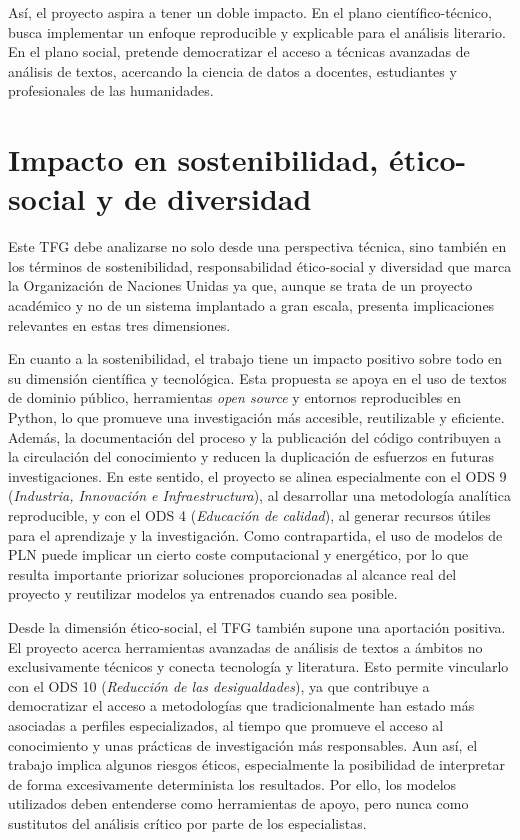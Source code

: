\documentclass[IB]{TFUOC}%
\begin{document}
Así, el proyecto aspira a tener un doble impacto. En el plano científico-técnico, busca implementar un enfoque reproducible y explicable para el análisis literario. En el plano social, pretende democratizar el acceso a técnicas avanzadas de análisis de textos, acercando la ciencia de datos a docentes, estudiantes y profesionales de las humanidades.

\section{Impacto en sostenibilidad, ético-social y de diversidad}

Este TFG debe analizarse no solo desde una perspectiva técnica, sino también en los términos de sostenibilidad, responsabilidad ético-social y diversidad que marca la Organización de Naciones Unidas\cite{onuodsweb} ya que, aunque se trata de un proyecto académico y no de un sistema implantado a gran escala, presenta implicaciones relevantes en estas tres dimensiones.

En cuanto a la sostenibilidad, el trabajo tiene un impacto positivo sobre todo en su dimensión científica y tecnológica. Esta propuesta se apoya en el uso de textos de dominio público, herramientas \textit{open source} y entornos reproducibles en Python, lo que promueve una investigación más accesible, reutilizable y eficiente. Además, la documentación del proceso y la publicación del código contribuyen a la circulación del conocimiento y reducen la duplicación de esfuerzos en futuras investigaciones. En este sentido, el proyecto se alinea especialmente con el ODS 9 (\textit{Industria, Innovación e Infraestructura}), al desarrollar una metodología analítica reproducible, y con el ODS 4 (\textit{Educación de calidad}), al generar recursos útiles para el aprendizaje y la investigación. Como contrapartida, el uso de modelos de PLN puede implicar un cierto coste computacional y energético, por lo que resulta importante priorizar soluciones proporcionadas al alcance real del proyecto y reutilizar modelos ya entrenados cuando sea posible.

Desde la dimensión ético-social, el TFG también supone una aportación positiva. El proyecto acerca herramientas avanzadas de análisis de textos a ámbitos no exclusivamente técnicos y conecta tecnología y literatura. Esto permite vincularlo con el ODS 10 (\textit{Reducción de las desigualdades}), ya que contribuye a democratizar el acceso a metodologías que tradicionalmente han estado más asociadas a perfiles especializados, al tiempo que promueve el acceso al conocimiento y unas prácticas de investigación más responsables. Aun así, el trabajo implica algunos riesgos éticos, especialmente la posibilidad de interpretar de forma excesivamente determinista los resultados. Por ello, los modelos utilizados deben entenderse como herramientas de apoyo, pero nunca como sustitutos del análisis crítico por parte de los especialistas.
\end{document}
